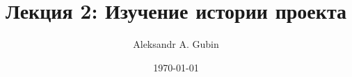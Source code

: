 \title{Лекция 2: Изучение истории проекта}
\author[Aleksandr Gubin]{Aleksandr A. Gubin}
\date{\today}
\begin{frame}
	\maketitle
\end{frame}
